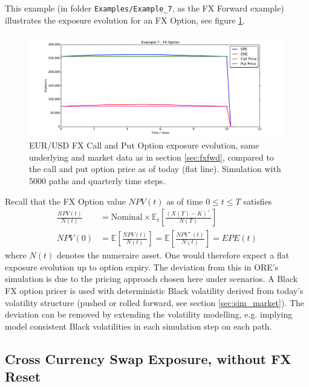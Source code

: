 \documentclass[12pt, a4paper]{article}
\newcommand\E{\ensuremath{\mathbb{E}}}
\newcommand{\EPE}{\mathit{EPE}}
\begin{document}
This example (in folder {\tt Examples/Example\_7}, as the FX Forward example) illustrates the exposure evolution for an
FX Option, see figure \ref{fig_7}.
\begin{figure}[h!]
\begin{center}
\includegraphics[scale=0.45]{mpl_fxoption.pdf}
\end{center}
\caption{EUR/USD FX Call and Put Option exposure evolution, same underlying and market data as in section
  \ref{sec:fxfwd}, compared to the call and put option price as of today (flat line). Simulation with 5000 paths and
  quarterly time steps.}
\label{fig_7}
\end{figure}
Recall that the FX Option value $NPV(t)$ as of time $0 \leq t \leq T$ satisfies
\begin{align*}
\frac{NPV(t)}{N(t)} &= \mbox{Nominal}\times\E_t\left[\frac{(X(T) - K)^+}{N(T)}\right]\\
NPV(0) &= \E\left[\frac{NPV(t)}{N(t)}\right] = \E\left[\frac{NPV^+(t)}{N(t)} \right]= \EPE(t) 
\end{align*}
where $N(t)$ denotes the numeraire asset.
One would therefore expect a flat exposure evolution up to option expiry. The deviation from this in ORE's simulation is
due to the pricing approach chosen here under scenarios. A Black FX option pricer is used with deterministic Black
volatility derived from today's volatility structure (pushed or rolled forward, see section \ref{sec:sim_market}). The
deviation can be removed by extending the volatility modelling, e.g. implying model consistent Black volatilities in
each simulation step on each path.  

\subsection{Cross Currency Swap Exposure, without FX Reset}
\end{document}
